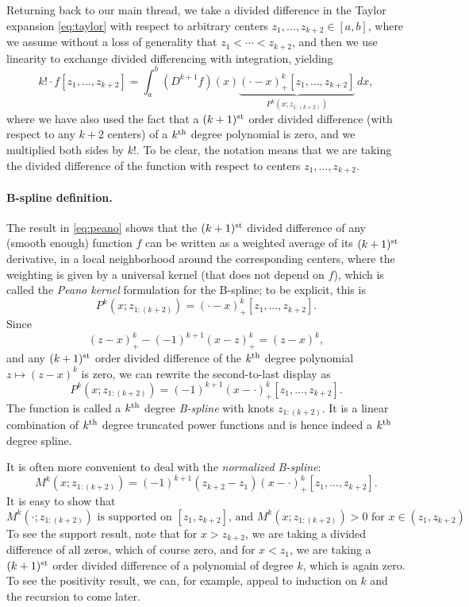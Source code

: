 \documentclass{article}
\begin{document}
Returning back to our main thread, we take a divided difference in the Taylor
expansion \eqref{eq:taylor} with respect to arbitrary centers $z_1,\dots,z_{k+2}
\in [a,b]$, where we assume without a loss of generality that $z_1 < \cdots <
z_{k+2}$, and then we use linearity to exchange divided differencing with
integration, yielding   
\begin{equation}
\label{eq:peano}
k! \cdot f[z_1,\dots,z_{k+2}] = \int_a^b (D^{k+1} f)(x)
\underbrace{(\cdot-x)^k_+[z_1,\dots,z_{k+2}]}_{P^k(x; z_{1:(k+2)})} \, dx, 
\end{equation}
where we have also used the fact that a $(k+1)^{\text{st}}$ order divided difference (with
respect to any $k+2$ centers) of a $k^{\text{th}}$ degree polynomial is zero, and we
multiplied both sides by $k!$. To be clear, the notation  means that we are taking the divided difference of
the function  with respect to centers
$z_1,\dots,z_{k+2}$.    

\paragraph{B-spline definition.}  

The result in \eqref{eq:peano} shows that the $(k+1)^{\text{st}}$ divided difference 
of any (smooth enough) function $f$ can be written as a weighted average of 
its $(k+1)^{\text{st}}$ derivative, in a local neighborhood around the corresponding
centers, where the weighting is given by a universal kernel  (that does not depend on $f$), which is called the \emph{Peano 
  kernel} formulation for the B-spline; to be explicit, this is
\[
P^k(x; z_{1:(k+2)}) = (\cdot - x)^k_+[z_1,\dots,z_{k+2}].
\]
Since 
\[
(z-x)^k_+ - (-1)^{k+1} (x-z)^k_+ =  (z-x)^k,
\]
and any $(k+1)^{\text{st}}$ order divided difference of the $k^{\text{th}}$ degree polynomial $z
\mapsto (z-x)^k$ is zero, we can rewrite the second-to-last display as
\[
P^k(x; z_{1:(k+2)}) = (-1)^{k+1} (x - \cdot)^k_+[z_1,\dots,z_{k+2}].
\]
The function  is called a $k^{\text{th}}$ degree
\emph{B-spline} with knots $z_{1:(k+2)}$. It is a linear combination of $k^{\text{th}}$ 
degree truncated power functions and is hence indeed a $k^{\text{th}}$ degree spline.  

It is often more convenient to deal with the \emph{normalized B-spline}:
\[
M^k(x; z_{1:(k+2)}) = (-1)^{k+1} (z_{k+2}-z_1) 
(x - \cdot)^k_+[z_1,\dots,z_{k+2}]. 
\]
It is easy to show that 
\[
\text{$M^k(\cdot; z_{1:(k+2)})$ is supported on $[z_1,z_{k+2}]$, and  
$M^k(x; z_{1:(k+2)})>0$ for $x \in (z_1,z_{k+2})$}.  
\]
To see the support result, note that for $x > z_{k+2}$, we are taking a divided
difference of all zeros, which of course zero, and for $x < z_1$, we are taking 
a $(k+1)^{\text{st}}$ order divided difference of a polynomial of degree $k$, which is
again zero. To see the positivity result, we can, for example, appeal to 
induction on $k$ and the recursion to come later.
\end{document}
